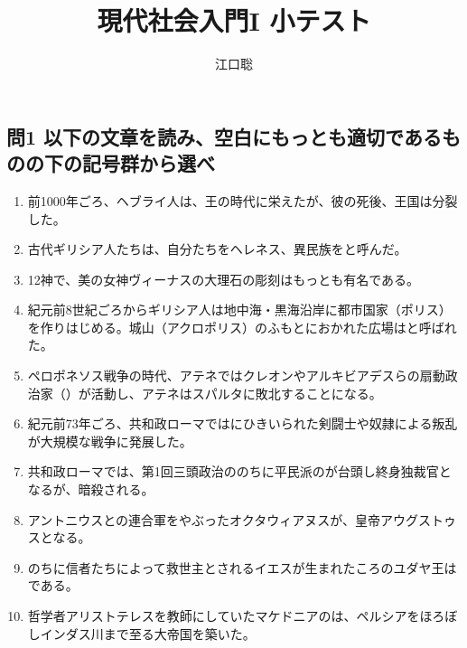 \documentclass[uplatex,dvipdfmx]{jsarticle}
\author{江口聡}
\title{現代社会入門I 小テスト}
\begin{document}
\maketitle

\subsection*{問1 以下の文章を読み、空白にもっとも適切であるものの下の記号群から選べ }

\begin{enumerate}

\setlength{\parskip}{.9zw}
\setlength{\itemsep}{.9zw}


\item  前1000年ごろ、ヘブライ人は、王の時代に栄えたが、彼の死後、王国は分裂した。


\item 古代ギリシア人たちは、自分たちをヘレネス、異民族をと呼んだ。

  
\item {}12神で、美の女神ヴィーナスの大理石の彫刻はもっとも有名である。


  
\item 紀元前8世紀ごろからギリシア人は地中海・黒海沿岸に都市国家（ポリス）を作りはじめる。城山（アクロポリス）のふもとにおかれた広場はと呼ばれた。

  
\item ペロポネソス戦争の時代、アテネではクレオンやアルキビアデスらの扇動政治家（）が活動し、アテネはスパルタに敗北することになる。
  

\item 紀元前73年ごろ、共和政ローマではにひきいられた剣闘士や奴隷による叛乱が大規模な戦争に発展した。

  
\item 共和政ローマでは、第1回三頭政治ののちに平民派のが台頭し終身独裁官となるが、暗殺される。

  
\item アントニウスとの連合軍をやぶったオクタウィアヌスが、皇帝アウグストゥスとなる。
  
\item のちに信者たちによって救世主とされるイエスが生まれたころのユダヤ王はである。
  
\item 哲学者アリストテレスを教師にしていたマケドニアのは、ペルシアをほろぼしインダス川まで至る大帝国を築いた。
  


\end{enumerate}
\end{document}

